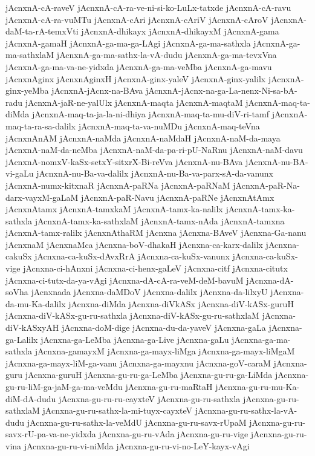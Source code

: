 {jAcnxnA-cA-raveV
jAcnxnA-cA-ra-ve-ni-si-ko-LuLx-tatxde
jAcnxnA-cA-ravu
jAcnxnA-cA-ra-vuMTu
jAcnxnA-cAri
jAcnxnA-cAriV
jAcnxnA-cAroV
jAcnxnA-daM-ta-rA-temxVti
jAcnxnA-dhikayx
jAcnxnA-dhikayxM
jAcnxnA-gama
jAcnxnA-gamaH
jAcnxnA-ga-ma-ga-LAgi
jAcnxnA-ga-ma-sathxla
jAcnxnA-ga-ma-sathxlaM
jAcnxnA-ga-ma-sathx-la-vA-dudu
jAcnxnA-ga-ma-tevxVna
jAcnxnA-ga-ma-va-ne-yidxda
jAcnxnA-ga-ma-veMba
jAcnxnA-ga-mavu
jAcnxnAginx
jAcnxnAginxH
jAcnxnA-ginx-yaleV
jAcnxnA-ginx-yalilx
jAcnxnA-ginx-yeMba
jAcnxnA-jAcnx-na-BAva
jAcnxnA-jAcnx-na-ga-La-nenx-Ni-sa-bA-radu
jAcnxnA-jaR-ne-yalUlx
jAcnxnA-maqta
jAcnxnA-maqtaM
jAcnxnA-maq-ta-diMda
jAcnxnA-maq-ta-ja-la-ni-dhiya
jAcnxnA-maq-ta-mu-diV-ri-tamf
jAcnxnA-maq-ta-ra-sa-dalilx
jAcnxnA-maq-ta-va-nuMDu
jAcnxnA-maq-teVna
jAcnxnAnAM
jAcnxnA-naMda
jAcnxnA-naMdaH
jAcnxnA-naM-da-maya
jAcnxnA-naM-da-neMba
jAcnxnA-naM-da-pa-ri-pU-NaRnu
jAcnxnA-naM-davu
jAcnxnA-nomxV-kaSx-setxY-sitxrX-Bi-reVva
jAcnxnA-nu-BAva
jAcnxnA-nu-BA-vi-gaLu
jAcnxnA-nu-Ba-va-dalilx
jAcnxnA-nu-Ba-va-parx-sA-da-vanunx
jAcnxnA-numx-kitxnaR
jAcnxnA-paRNa
jAcnxnA-paRNaM
jAcnxnA-paR-Na-darx-vayxM-gaLaM
jAcnxnA-paR-Navu
jAcnxnA-paRNe
jAcnxnAtAmx
jAcnxnAtamx
jAcnxnA-tamxkaM
jAcnxnA-tamx-ka-nalilx
jAcnxnA-tamx-ka-sathxla
jAcnxnA-tamx-ka-sathxlaM
jAcnxnA-tamx-nAda
jAcnxnA-tamxna
jAcnxnA-tamx-ralilx
jAcnxnAthaRM
jAcnxna
jAcnxna-BAveV
jAcnxna-Ga-nanu
jAcnxnaM
jAcnxnaMca
jAcnxna-boV-dhakaH
jAcnxna-ca-karx-dalilx
jAcnxna-cakuSx
jAcnxna-ca-kuSx-dAvxRrA
jAcnxna-ca-kuSx-vanunx
jAcnxna-ca-kuSx-vige
jAcnxna-ci-hAnxni
jAcnxna-ci-henx-gaLeV
jAcnxna-citf
jAcnxna-citutx
jAcnxna-ci-tutx-da-ya-vAgi
jAcnxna-dA-cA-ra-veM-deM-bavuM
jAcnxna-dA-soVha
jAcnxnada
jAcnxna-daMDoV
jAcnxna-dalilx
jAcnxna-da-lilxyU
jAcnxna-da-mu-Ka-dalilx
jAcnxna-diMda
jAcnxna-diVkASx
jAcnxna-diV-kASx-guruH
jAcnxna-diV-kASx-gu-ru-sathxla
jAcnxna-diV-kASx-gu-ru-sathxlaM
jAcnxna-diV-kASxyAH
jAcnxna-doM-dige
jAcnxna-du-da-yaveV
jAcnxna-gaLa
jAcnxna-ga-Lalilx
jAcnxna-ga-LeMba
jAcnxna-ga-Live
jAcnxna-gaLu
jAcnxna-ga-ma-sathxla
jAcnxna-gamayxM
jAcnxna-ga-mayx-liMga
jAcnxna-ga-mayx-liMgaM
jAcnxna-ga-mayx-liM-ga-vanu
jAcnxna-ga-mayxnu
jAcnxna-goV-caraM
jAcnxna-guru
jAcnxna-guruH
jAcnxna-gu-ru-ga-LeMba
jAcnxna-gu-ru-ga-LiMda
jAcnxna-gu-ru-liM-ga-jaM-ga-ma-veMdu
jAcnxna-gu-ru-maRtaH
jAcnxna-gu-ru-mu-Ka-diM-dA-dudu
jAcnxna-gu-ru-ru-cayxteV
jAcnxna-gu-ru-sathxla
jAcnxna-gu-ru-sathxlaM
jAcnxna-gu-ru-sathx-la-mi-tuyx-cayxteV
jAcnxna-gu-ru-sathx-la-vA-dudu
jAcnxna-gu-ru-sathx-la-veMdU
jAcnxna-gu-ru-savx-rUpaM
jAcnxna-gu-ru-savx-rU-pa-va-ne-yidxda
jAcnxna-gu-ru-vAda
jAcnxna-gu-ru-vige
jAcnxna-gu-ru-vina
jAcnxna-gu-ru-vi-niMda
jAcnxna-gu-ru-vi-no-LeY-kayx-vAgi
}

